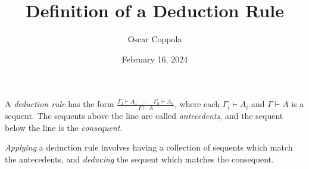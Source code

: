 \documentclass[a4paper]{article}
\title{Definition of a Deduction Rule}
\date{February 16, 2024}
\author{Oscar Coppola}
\begin{document}
\maketitle
\par{
    A \emph{deduction rule} has the form \(\frac { \Gamma _1 \vdash  A_1 \quad \cdots \quad \Gamma _n \vdash  A_n}{ \Gamma \vdash  A}\),
    where each \(\Gamma _i \vdash  A_i\) and \(\Gamma \vdash  A\) is a sequent.
    The sequents above the line are called \emph{antecedents}, and the sequent below the line is the \emph{consequent}.
}\par{\emph{Applying} a deduction rule involves having a collection of sequents which match the antecedents,
    and \emph{deducing} the sequent which matches the consequent.
}
\printbibliography
\end{document}

